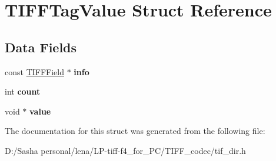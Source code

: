 \hypertarget{struct_t_i_f_f_tag_value}{}\section{T\+I\+F\+F\+Tag\+Value Struct Reference}
\label{struct_t_i_f_f_tag_value}
\subsection*{Data Fields}
\begin{DoxyCompactItemize}
\item 
\hypertarget{struct_t_i_f_f_tag_value_ad9416e24d6277116d625e9fc369e93ab}{}const \hyperlink{struct___t_i_f_f_field}{T\+I\+F\+F\+Field} $\ast$ {\bfseries info}\label{struct_t_i_f_f_tag_value_ad9416e24d6277116d625e9fc369e93ab}

\item 
\hypertarget{struct_t_i_f_f_tag_value_ad43c3812e6d13e0518d9f8b8f463ffcf}{}int {\bfseries count}\label{struct_t_i_f_f_tag_value_ad43c3812e6d13e0518d9f8b8f463ffcf}

\item 
\hypertarget{struct_t_i_f_f_tag_value_a0f61d63b009d0880a89c843bd50d8d76}{}void $\ast$ {\bfseries value}\label{struct_t_i_f_f_tag_value_a0f61d63b009d0880a89c843bd50d8d76}

\end{DoxyCompactItemize}


The documentation for this struct was generated from the following file\+:\begin{DoxyCompactItemize}
\item 
D\+:/\+Sasha personal/lena/\+L\+P-\/tiff-\/f4\+\_\+for\+\_\+\+P\+C/\+T\+I\+F\+F\+\_\+codec/tif\+\_\+dir.\+h\end{DoxyCompactItemize}
